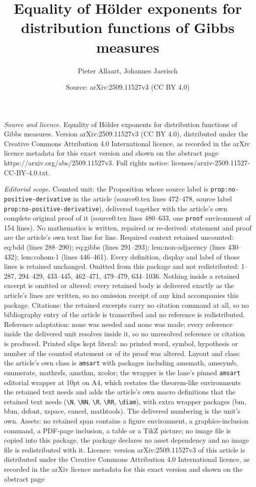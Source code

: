 \documentclass[10pt,a4paper]{amsart}
\title[Equality of H\"older exponents for distribution functions of]{Equality of H\"older exponents for distribution functions of Gibbs measures}
\author{Pieter Allaart, Johannes Jaerisch}
\date{Source: arXiv:2509.11527v3 (CC BY 4.0)}
\begin{document}
\maketitle

\noindent\emph{Source and licence.} Equality of H\"older exponents for distribution functions of Gibbs measures. Version arXiv:2509.11527v3 (CC BY 4.0), distributed under the Creative Commons Attribution 4.0 International licence, as recorded in the arXiv licence metadata for this exact version and shown on the abstract page https://arxiv.org/abs/2509.11527v3. Full rights notice: licenses/arxiv-2509.11527-CC-BY-4.0.txt.\par\smallskip

\noindent\textit{Editorial scope.} Counted unit: the Proposition whose source label is \texttt{prop:no-positive-derivative} in the article (source0.tex lines 472--478, source label \texttt{prop:no-positive-derivative}), delivered together with the article's own complete original proof of it (source0.tex lines 480--633, one \texttt{proof} environment of 154 lines). No mathematics is written, repaired or re-derived: statement and proof are the article's own text line for line. Required context retained uncounted: eq:bdd (lines 288--290); eq:gibbs (lines 291--293); lem:non-adjacency (lines 430--432); lem:cohom-1 (lines 446--461). Every definition, display and label of those lines is retained unchanged. Omitted from this package and not redistributed: 1--287, 294--429, 433--445, 462--471, 479--479, 634--1036. Nothing inside a retained excerpt is omitted or altered: every retained body is delivered exactly as the article's lines are written, so no omission receipt of any kind accompanies this package. Citations: the retained excerpts carry no citation command at all, so no bibliography entry of the article is transcribed and no reference is redistributed. Reference adaptation: none was needed and none was made; every reference inside the delivered unit resolves inside it, so no unresolved reference or citation is produced. Printed slips kept literal: no printed word, symbol, hypothesis or number of the counted statement or of its proof was altered. Layout and class: the article's own class is \texttt{amsart} with packages including amsmath, amssymb, enumerate, mathrsfs, amsthm, xcolor; the wrapper is the lane's pinned \texttt{amsart} editorial wrapper at 10pt on A4, which restates the theorem-like environments the retained text needs and adds the article's own macro definitions that the retained text needs (\texttt{\textbackslash N}, \texttt{\textbackslash NN}, \texttt{\textbackslash R}, \texttt{\textbackslash RR}, \texttt{\textbackslash diam}), with extra wrapper packages (bm, bbm, dsfont, xspace, cancel, mathtools). The delivered numbering is the unit's own. Assets: no retained span contains a figure environment, a graphics-inclusion command, a PDF-page inclusion, a table or a TikZ picture; no image file is copied into this package, the package declares no asset dependency and no image file is redistributed with it. Licence: version arXiv:2509.11527v3 of this article is distributed under the Creative Commons Attribution 4.0 International licence, as recorded in the arXiv licence metadata for this exact version and shown on the abstract page 
\end{document}
